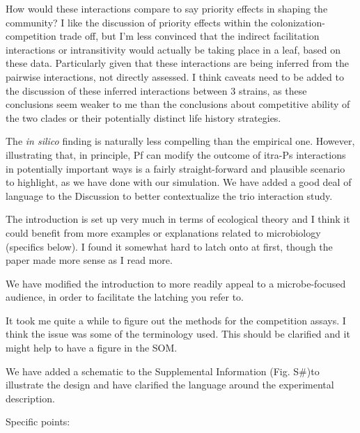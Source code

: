 \documentclass[11pt,]{article}
\begin{document}
\begin{blockquote}
How would these interactions compare to say priority effects in shaping
the community? I like the discussion of priority effects within the
colonization-competition trade off, but I'm less convinced that the
indirect facilitation interactions or intransitivity would actually be
taking place in a leaf, based on these data. Particularly given that
these interactions are being inferred from the pairwise interactions,
not directly assessed. I think caveats need to be added to the
discussion of these inferred interactions between 3 strains, as these
conclusions seem weaker to me than the conclusions about competitive
ability of the two clades or their potentially distinct life history
strategies.
\end{blockquote}

The \emph{in silico} finding is naturally less compelling than the
empirical one. However, illustrating that, in principle, Pf can modify
the outcome of itra-Ps interactions in potentially important ways is a
fairly straight-forward and plausible scenario to highlight, as we have
done with our simulation. We have added a good deal of language to the
Discussion to better contextualize the trio interaction study.

\begin{blockquote}
The introduction is set up very much in terms of ecological theory and I
think it could benefit from more examples or explanations related to
microbiology (specifics below). I found it somewhat hard to latch onto
at first, though the paper made more sense as I read more.
\end{blockquote}

We have modified the introduction to more readily appeal to a
microbe-focused audience, in order to facilitate the latching you refer
to.

\begin{blockquote}
It took me quite a while to figure out the methods for the competition
assays. I think the issue was some of the terminology used. This should
be clarified and it might help to have a figure in the SOM.
\end{blockquote}

We have added a schematic to the Supplemental Information (Fig. S\#)to
illustrate the design and have clarified the language around the
experimental description.

\begin{blockquote}
Specific points:
\end{blockquote}
\end{document}
